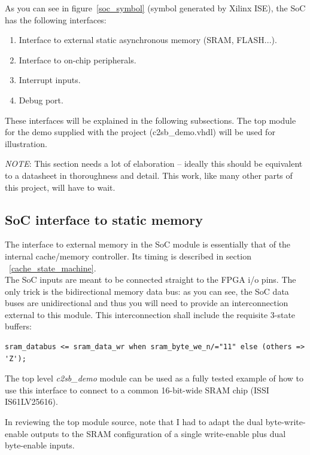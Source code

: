 As you can see in figure~\ref{soc_symbol} (symbol generated by Xilinx ISE), 
the SoC has the following interfaces:

\begin{enumerate}
    \item Interface to external static asynchronous memory (SRAM, FLASH...).
    \item Interface to on-chip peripherals.
    \item Interrupt inputs.
    \item Debug port.
\end{enumerate}

These interfaces will be explained in the following subsections. The top module
for the demo supplied with the project (c2sb\_demo.vhdl) will be used for 
illustration.

\emph{NOTE}: This section needs a lot of elaboration -- ideally this should be 
equivalent to a datasheet in thoroughness and detail. This work, like many 
other parts of this project, will have to wait.

\subsection{SoC interface to static memory}
\label{soc_if_sram}

The interface to external memory in the SoC module is essentially that of the 
internal cache/memory controller. Its timing is described in section 
~\ref{cache_state_machine}.\\

The SoC inputs are meant to be connected straight to the FPGA i/o pins. The only
trick is the bidirectional memory data bus: as you can see, the SoC data buses 
are unidirectional and thus you will need to provide an interconnection
external to this module. This interconnection shall include the requisite 
3-state buffers:

\begin{verbatim}
sram_databus <= sram_data_wr when sram_byte_we_n/="11" else (others => 'Z');
\end{verbatim}

The top level \emph{c2sb\_demo} module can be used as a fully tested example of 
how to use this interface to connect to a common 16-bit-wide SRAM chip 
(ISSI IS61LV25616).

In reviewing the top module source, note that I had to adapt the dual 
byte-write-enable outputs to the SRAM
configuration of a single write-enable plus dual byte-enable inputs.

